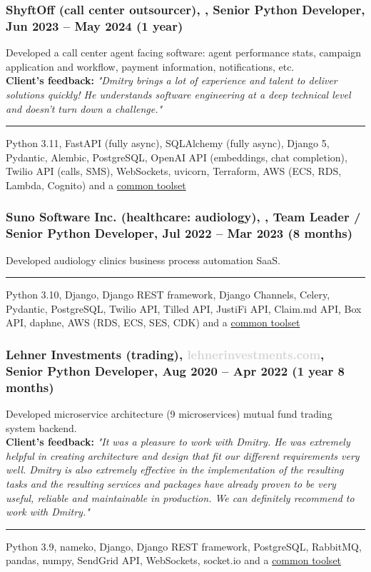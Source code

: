 \documentclass[a4paper,8pt]{extarticle}
\newcommand{\chref}[2]{\href{#1}{\underline{\smash{#2}}}}  %
\newcommand{\itchref}[2]{\chref{#1}{\textit{#2}}}  %
\newcommand{\chrule}{\vspace{3pt}\hrule}
\begin{document}
\subsubsection*{ShyftOff (call center outsourcer), \itchref{https://shyftoff.com}{shyftoff.com}, Senior Python Developer, Jun 2023 -- May 2024 (1 year)}
Developed a call center agent facing software: agent performance stats, campaign application and workflow, payment information, notifications, etc.\\
\textbf{Client's feedback:} \textit{"Dmitry brings a lot of experience and talent to deliver solutions quickly! He understands software engineering at a deep technical level and doesn't turn down a challenge."}
\chrule
Python 3.11, FastAPI (fully async), SQLAlchemy (fully async), Django 5, Pydantic, Alembic, PostgreSQL, OpenAI API (embeddings, chat completion), Twilio API (calls, SMS), WebSockets, uvicorn, Terraform, AWS (ECS, RDS, Lambda, Cognito) and a \hyperlink{common-toolset}{common toolset}

\subsubsection*{Suno Software Inc. (healthcare: audiology), \itchref{https://suno.tech}{suno.tech}, Team Leader / Senior Python Developer, Jul 2022 -- Mar 2023 (8 months)}
Developed audiology clinics business process automation SaaS.
\chrule
Python 3.10, Django, Django REST framework, Django Channels, Celery, Pydantic, PostgreSQL, Twilio API, Tilled API, JustiFi API, Claim.md API, Box API, daphne, AWS (RDS, ECS, SES, CDK) and a \hyperlink{common-toolset}{common toolset}

\subsubsection*{Lehner Investments (trading), \textcolor{lightgray}{lehnerinvestments.com}, \textbf{Senior Python Developer}, Aug 2020 -- Apr 2022 (1 year 8 months)}
Developed microservice architecture (9 microservices) mutual fund trading system backend.\\
\textbf{Client's feedback:} \textit{"It was a pleasure to work with Dmitry. He was extremely helpful in creating architecture and design that fit our different requirements very well. Dmitry is also extremely effective in the implementation of the resulting tasks and the resulting services and packages have already proven to be very useful, reliable and maintainable in production. We can definitely recommend to work with Dmitry."}
\chrule
Python 3.9, nameko, Django, Django REST framework, PostgreSQL, RabbitMQ, pandas, numpy, SendGrid API, WebSockets, socket.io and a \hyperlink{common-toolset}{common toolset}
\end{document}
